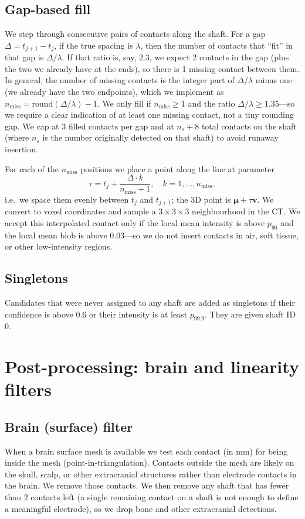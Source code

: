 \documentclass[11pt,a4paper]{article}
\newcommand{\vm}{\boldsymbol{\mu}}
\newcommand{\vv}{\mathbf{v}}
\begin{document}
\subsection{Gap-based fill}
We step through consecutive pairs of contacts along the shaft. For a gap \(\Delta = t_{j+1} - t_j\), if the true spacing is \(\lambda\), then the number of contacts that ``fit'' in that gap is \(\Delta/\lambda\). If that ratio is, say, 2.3, we expect 2 contacts in the gap (plus the two we already have at the ends), so there is 1 missing contact between them. In general, the number of missing contacts is the integer part of \(\Delta/\lambda\) minus one (we already have the two endpoints), which we implement as \(n_{\mathrm{miss}} = \mathrm{round}(\Delta / \lambda) - 1\). We only fill if \(n_{\mathrm{miss}} \geq 1\) and the ratio \(\Delta/\lambda \geq 1.35\)---so we require a clear indication of at least one missing contact, not a tiny rounding gap. We cap at 3 filled contacts per gap and at \(n_s + 8\) total contacts on the shaft (where \(n_s\) is the number originally detected on that shaft) to avoid runaway insertion.

For each of the \(n_{\mathrm{miss}}\) positions we place a point along the line at parameter
\[
\tau = t_j + \frac{\Delta \cdot k}{n_{\mathrm{miss}} + 1}, \quad k = 1,\ldots,n_{\mathrm{miss}},
\]
i.e.\ we space them evenly between \(t_j\) and \(t_{j+1}\); the 3D point is \(\vm + \tau \vv\). We convert to voxel coordinates and sample a \(3\times3\times3\) neighbourhood in the CT. We accept this interpolated contact only if the local mean intensity is above \(p_{90}\) and the local mean blob is above 0.03---so we do not insert contacts in air, soft tissue, or other low-intensity regions.

\subsection{Singletons}
Candidates that were never assigned to any shaft are added as singletons if their confidence is above 0.6 or their intensity is at least \(p_{99.9}\). They are given shaft ID 0.

\section{Post-processing: brain and linearity filters}
\label{sec:post}

\subsection{Brain (surface) filter}
When a brain surface mesh is available we test each contact (in mm) for being inside the mesh (point-in-triangulation). Contacts outside the mesh are likely on the skull, scalp, or other extracranial structures rather than electrode contacts in the brain. We remove those contacts. We then remove any shaft that has fewer than 2 contacts left (a single remaining contact on a shaft is not enough to define a meaningful electrode), so we drop bone and other extracranial detections.
\end{document}
